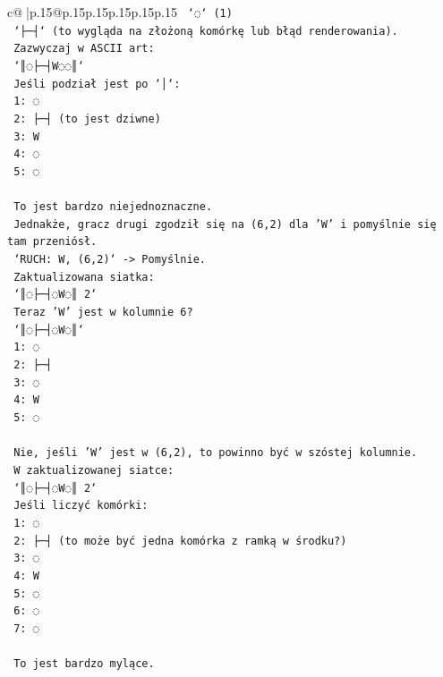\documentclass{article}
\begin{document}
{\begin{supertabular}{c@{$\;$}|p{.15\linewidth}@{}p{.15\linewidth}p{.15\linewidth}p{.15\linewidth}p{.15\linewidth}p{.15\linewidth}}
{{{\texttt{   `◌` (1)} \\
\texttt{   `├─┤` (to wygląda na złożoną komórkę lub błąd renderowania).} \\
\texttt{   Zazwyczaj w ASCII art:} \\
\texttt{   `║◌├─┤W◌◌║`} \\
\texttt{   Jeśli podział jest po `│`:} \\
\texttt{   1: ◌} \\
\texttt{   2: ├─┤ (to jest dziwne)} \\
\texttt{   3: W} \\
\texttt{   4: ◌} \\
\texttt{   5: ◌} \\
\\ 
\texttt{   To jest bardzo niejednoznaczne.} \\
\texttt{   Jednakże, gracz drugi zgodził się na (6,2) dla 'W' i pomyślnie się tam przeniósł.} \\
\texttt{   `RUCH: W, (6,2)` {-}> Pomyślnie.} \\
\texttt{   Zaktualizowana siatka:} \\
\texttt{   `║◌├─┤◌W◌║ 2`} \\
\texttt{   Teraz 'W' jest w kolumnie 6?} \\
\texttt{   `║◌├─┤◌W◌║`} \\
\texttt{   1: ◌} \\
\texttt{   2: ├─┤} \\
\texttt{   3: ◌} \\
\texttt{   4: W} \\
\texttt{   5: ◌} \\
\\ 
\texttt{   Nie, jeśli 'W' jest w (6,2), to powinno być w szóstej kolumnie.} \\
\texttt{   W zaktualizowanej siatce:} \\
\texttt{   `║◌├─┤◌W◌║ 2`} \\
\texttt{   Jeśli liczyć komórki:} \\
\texttt{   1: ◌} \\
\texttt{   2: ├─┤ (to może być jedna komórka z ramką w środku?)} \\
\texttt{   3: ◌} \\
\texttt{   4: W} \\
\texttt{   5: ◌} \\
\texttt{   6: ◌} \\
\texttt{   7: ◌} \\
\\ 
\texttt{   To jest bardzo mylące.} \\
}}}
\end{supertabular}}
\end{document}
